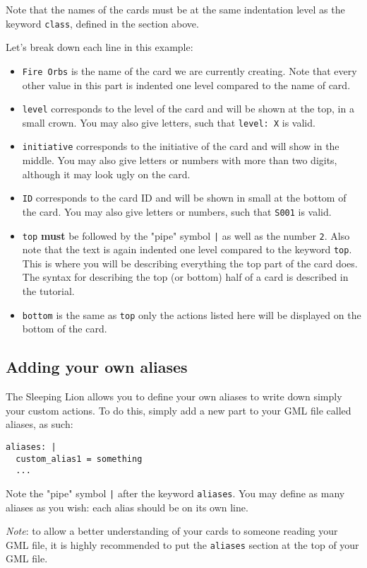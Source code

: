 \documentclass{article}
\begin{document}
Note that the names of the cards must be at the same indentation level as the keyword \verb`class`, defined in the section above.

Let's break down each line in this example:
\begin{itemize}
	\item \verb`Fire Orbs` is the name of the card we are currently creating. Note that every other value in this part is indented one level compared to the name of card.
	\item \verb`level` corresponds to the level of the card and will be shown at the top, in a small crown. You may also give letters, such that \verb`level: X` is valid.
	\item \verb`initiative` corresponds to the initiative of the card and will show in the middle. You may also give letters or numbers with more than two digits, although it may look ugly on the card.
	\item \verb`ID` corresponds to the card ID and will be shown in small at the bottom of the card. You may also give letters or numbers, such that \verb`S001` is valid.
	\item \verb`top` \textbf{must} be followed by the "pipe" symbol \verb`|` as well as the number \verb`2`. Also note that the text is again indented one level compared to the keyword \verb`top`. This is where you will be describing everything the top part of the card does. The syntax for describing the top (or bottom) half of a card is described in the tutorial.
	\item \verb`bottom` is the same as \verb`top` only the actions listed here will be displayed on the bottom of the card.
\end{itemize}

\subsection{Adding your own aliases}
The Sleeping Lion allows you to define your own aliases to write down simply your custom actions. To do this, simply add a new part to your GML file called aliases, as such:

\begin{center}
\begin{BVerbatim}
aliases: |
  custom_alias1 = something
  ...
\end{BVerbatim}
\end{center}

Note the "pipe" symbol \verb'|' after the keyword \verb'aliases'. You may define as many aliases as you wish: each alias should be on its own line.

\textit{Note}: to allow a better understanding of your cards to someone reading your GML file, it is highly recommended to put the \verb`aliases` section at the top of your GML file.
\end{document}
